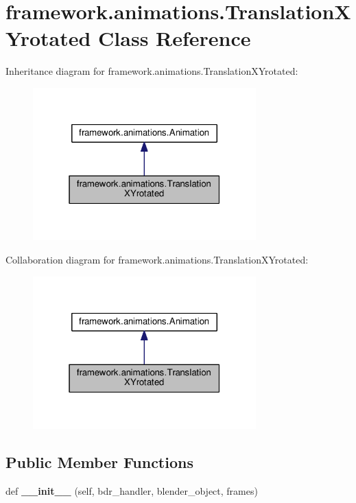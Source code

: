 \hypertarget{classframework_1_1animations_1_1TranslationXYrotated}{}\section{framework.\+animations.\+Translation\+X\+Yrotated Class Reference}
\label{classframework_1_1animations_1_1TranslationXYrotated}


Inheritance diagram for framework.\+animations.\+Translation\+X\+Yrotated\+:
\nopagebreak
\begin{figure}[H]
\begin{center}
\leavevmode
\includegraphics[width=244pt]{classframework_1_1animations_1_1TranslationXYrotated__inherit__graph}
\end{center}
\end{figure}


Collaboration diagram for framework.\+animations.\+Translation\+X\+Yrotated\+:
\nopagebreak
\begin{figure}[H]
\begin{center}
\leavevmode
\includegraphics[width=244pt]{classframework_1_1animations_1_1TranslationXYrotated__coll__graph}
\end{center}
\end{figure}
\subsection*{Public Member Functions}
\begin{DoxyCompactItemize}
\item 
def {\bfseries \+\_\+\+\_\+init\+\_\+\+\_\+} (self, bdr\+\_\+handler, blender\+\_\+object, frames)\hypertarget{classframework_1_1animations_1_1TranslationXYrotated_aa74ae01288abcc53255b3e98b9cb935a}{}\label{classframework_1_1animations_1_1TranslationXYrotated_aa74ae01288abcc53255b3e98b9cb935a}

\end{DoxyCompactItemize}
